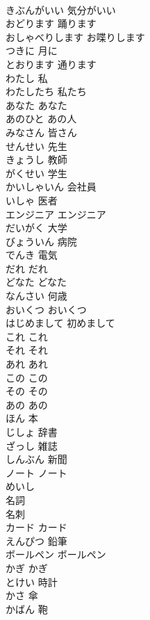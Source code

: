 \documentclass[8pt]{extreport}
\begin{document}
\begin{CJK}{UTF8}{min}
\\	きぶんがいい	気分がいい
\\	おどります	踊ります
\\	おしゃべりします	お喋りします
\\	つきに	月に
\\	とおります	通ります
\\	わたし	私
\\	わたしたち	私たち
\\	あなた	あなた
\\	あのひと	あの人
\\	みなさん	皆さん
\\	せんせい	先生
\\	きょうし	教師
\\	がくせい	学生
\\	かいしゃいん	会社員
\\	いしゃ	医者
\\	エンジニア	エンジニア
\\	だいがく	大学
\\	びょういん	病院
\\	でんき	電気
\\	だれ	だれ
\\	どなた	どなた
\\	なんさい	何歳
\\	おいくつ	おいくつ
\\	はじめまして	初めまして
\\	これ	これ
\\	それ	それ
\\	あれ	あれ
\\	この	この
\\	その	その
\\	あの	あの
\\	ほん	本
\\	じしょ	辞書
\\	ざっし	雑誌
\\	しんぶん	新聞
\\	ノート	ノート
\\	めいし	
\\	名詞 
\\	名刺
\\	カード	カード
\\	えんぴつ	鉛筆
\\	ボールペン	ボールペン
\\	かぎ	かぎ
\\	とけい	時計
\\	かさ	傘
\\	かばん	鞄

\end{CJK}
\end{document}
